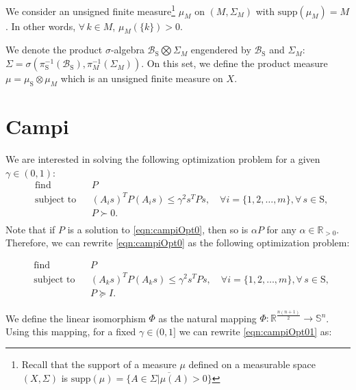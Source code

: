 \documentclass[letterpaper, 10 pt, conference]{ieeeconf}  %
\newcommand{\R}{\mathbb{R} }
\newcommand{\sphere}{\text{S}}
\begin{document}
We consider an unsigned finite measure\footnote{Recall that the support of a measure $\mu$ defined on a measurable space $(X, \Sigma)$ is $\text{supp}(\mu) = \overline{\{A \in \Sigma | \mu(A) > 0 \}}$} $\mu_M$ on $(M, \Sigma_M)$ with $\text{supp} (\mu_M) = M$. In other words, $\forall\,k \in M$, $\mu_M(\{k\})  > 0$.


We denote the product $\sigma$-algebra $\mathcal{B}_{\sphere} \bigotimes \Sigma_M$ engendered by $\mathcal{B}_{\sphere}$ and $\Sigma_M$: $\Sigma = \sigma( \pi_{\sphere}^{-1}(\mathcal{B}_{\sphere}),  \pi_{M}^{-1}(\Sigma_M))$. On this set, we define the product measure $\mu = \mu_{\sphere} \otimes \mu_M$ which is an unsigned finite measure on $X$.

\section{Campi}

We are interested in solving the following optimization problem for a given $\gamma \in (0,1)$:
\begin{equation}
\label{eqn:campiOpt0}
\begin{aligned}
& \text{find} & & P \\
& \text{subject to} 
&  & (A_is)^TP(A_is) \leq \gamma^2 s^TPs, \quad \forall i = \{1,2, \ldots, m\},  \forall\, s \in \sphere,\\
& && P \succ 0. \\
\end{aligned}
\end{equation}
Note that if $P$ is a solution to \eqref{eqn:campiOpt0}, then so is $\alpha P$ for any $\alpha \in \R_{> 0}.$Therefore, we can rewrite \eqref{eqn:campiOpt0} as the following optimization problem:

\begin{equation}
\label{eqn:campiOpt01}
\begin{aligned}
& \text{find} & & P \\
& \text{subject to} 
&  & (A_ks)^TP(A_ks) \leq \gamma^2 s^TPs, \quad \forall i = \{1,2, \ldots, m\},  \forall\, s \in \sphere,\\
& & & P \succeq I.
\end{aligned}
\end{equation}

We define the linear isomorphism $\Phi$ as the natural mapping \mbox{$\Phi: \mathbb{R}^{\frac{n(n+1)}{2}} \to \mathbb{S}^n$.} Using this mapping, for a fixed $\gamma \in (0, 1]$ we can rewrite \eqref{eqn:campiOpt01} as:
\end{document}
